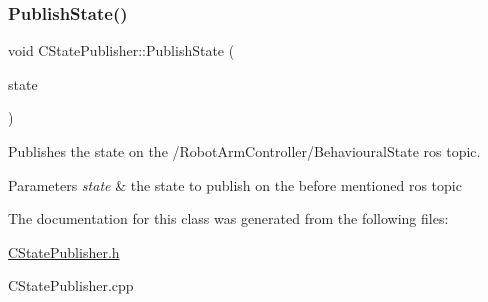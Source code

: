 \subsubsection{\texorpdfstring{Publish\+State()}{PublishState()}}
{\footnotesize\ttfamily void C\+State\+Publisher\+::\+Publish\+State (\begin{DoxyParamCaption}\item[{\hyperlink{CStatePublisher_8h_a57ce604a7850ac5988b6182daf162fe9}{e\+Publishable\+States}}]{state }\end{DoxyParamCaption})}



Publishes the state on the /\+Robot\+Arm\+Controller/\+Behavioural\+State ros topic. 


\begin{DoxyParams}{Parameters}
{\em state} & the state to publish on the before mentioned ros topic \\
\hline
\end{DoxyParams}


The documentation for this class was generated from the following files\+:\begin{DoxyCompactItemize}
\item 
\hyperlink{CStatePublisher_8h}{C\+State\+Publisher.\+h}\item 
C\+State\+Publisher.\+cpp\end{DoxyCompactItemize}
